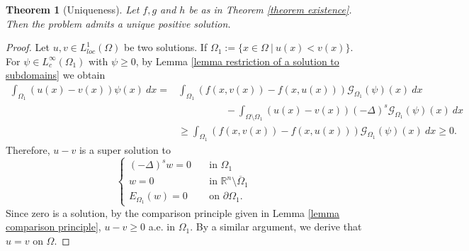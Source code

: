 \documentclass{amsart}
\newtheorem{theorem}{Theorem}[section]
\newtheorem{corollary}[theorem]{Corollary}
\newcommand{\R}{\mathbb{R}}
\newcommand{\slap}{(-\Delta)^{s}}
\newcommand{\g}[1]{\mathcal{G}_{#1}}
\begin{document}
\begin{theorem}[Uniqueness]
Let  $f,g$ and $h$ be as in Theorem \ref{theorem existence}. Then the problem admits a unique positive solution.
\end{theorem}
 \begin{proof}
    Let $u, v\in L^{1}_{loc}(\Omega)$ be two solutions. %
    If $\Omega_{1}:=\{x\in \Omega~|~u(x)<v(x)\}$. %
     For $\psi\in L_{c}^{\infty}(\Omega_{1})$ with $\psi\geq 0$, by Lemma \ref{lemma restriction of a solution to subdomains} we obtain
    \begin{equation*}
    \begin{split}
        \int_{\Omega_{1}}\left(u(x)-v(x)\right)\psi(x)\ dx=&\int_{\Omega_{1}}\left(f\left(x,v(x)\right)-f\left(x,u(x)\right)\right)\g{\Omega_{1}}(\psi)(x)\ dx\\
        &\hspace{2cm} -\int_{\Omega\setminus\Omega_{1}} \left(u(x)-v(x)\right)\slap\g{\Omega_{1}}(\psi)(x)\ dx\\
        &\geq \int_{\Omega_{1}}\left(f\left(x,v(x)\right)-f\left(x,u(x)\right)\right)\g{\Omega_{1}}(\psi)(x)\ dx\geq 0.
        \end{split}
    \end{equation*}
    Therefore, $u-v$ is a super solution to 
    \begin{equation*}
        \begin{cases}
            \slap w=0\quad &\text{in }\Omega_{1}\\
            w=0 &\text{in }\R^{n}\setminus\overline{\Omega}_{1}\\
            E_{\Omega_{1}}(w)=0 &\text{on }\partial\Omega_{1}.
        \end{cases}
    \end{equation*}
    Since zero is a solution, by the comparison principle given in Lemma \ref{lemma comparison principle}, $u-v\geq 0$ a.e. in $\Omega_{1}$. By a similar argument, we derive that $u=v$ on $\Omega$.
\end{proof} 
\end{document}
